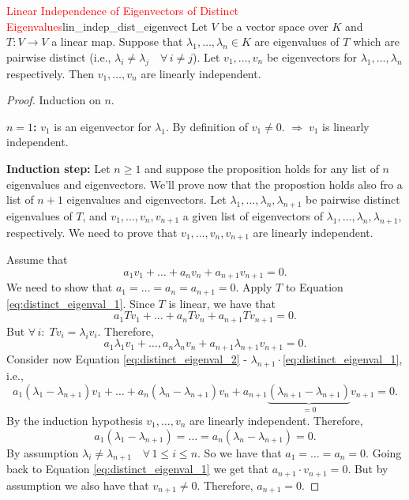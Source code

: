 \begin{proposition}{\textcolor{red}{Linear Independence of Eigenvectors of Distinct Eigenvalues}}{lin_indep_dist_eigenvect}
	Let $V$ be a vector space over $K$ and $T:V \to V$ a linear map. Suppose that $\lambda_1, \hdots , \lambda_n \in K$ are eigenvalues of $T$ which are pairwise distinct (i.e., $\lambda_i \neq \lambda_j \quad \forall \, i \neq j$). Let $v_1, \hdots , v_n$ be eigenvectors for $\lambda_1, \hdots, \lambda_n$ respectively. Then $v_1, \hdots, v_n$ are linearly independent.
\end{proposition}

\begin{proof}
	Induction on $n$.
	
	\textbf{$n = 1$:} $v_1$ is an eigenvector for $\lambda_1$. By definition of $v_1 \neq 0$. $\Longrightarrow \; v_1$ is linearly independent.
	
	\textbf{Induction step:} Let $n \geq 1$ and suppose the proposition holds for any list of $n$ eigenvalues and eigenvectors. We'll prove now that the propostion holds also fro a list of $n+1$ eigenvalues and eigenvectors. Let $\lambda_1, \hdots, \lambda_n, \lambda_{n+1}$ be pairwise distinct eigenvalues of $T$, and $v_1, \hdots , v_n, v_{n+1}$ a given list of eigenvectors of $\lambda_1, \hdots, \lambda_n, \lambda_{n+1}$, respectively. We need to prove that $v_1, \hdots , v_n, v_{n+1}$ are linearly independent.
	
	Assume that 
	\begin{equation}
		\label{eq:distinct_eigenval_1}
		a_1v_1 + \hdots + a_n v_n + a_{n+1} v_{n+1} = 0.
	\end{equation}
	We need to show that $a_1 = \hdots = a_n = a_{n+1} = 0$. Apply $T$ to Equation \eqref{eq:distinct_eigenval_1}. Since $T$ is linear, we have that
	\[
		a_1 Tv_1 + \hdots + a_n Tv_n + a_{n+1} Tv_{n+1} = 0.
	\]
	But $\forall \,i :\; Tv_i = \lambda_i v_i$. Therefore,
	\begin{equation}
		\label{eq:distinct_eigenval_2}
		a_1 \lambda_1 v_1 + \hdots, a_n \lambda_n v_n + a_{n+1}\lambda_{n+1}v_{n+1} = 0.
	\end{equation}
	Consider now Equation \eqref{eq:distinct_eigenval_2} - $\lambda_{n+1} \cdot $\eqref{eq:distinct_eigenval_1}, i.e.,
	\[
		a_1 (\lambda_1 - \lambda_{n+1}) v_1 + \hdots + a_n (\lambda_n - \lambda_{n+1}) v_n + a_{n+1}\underbrace{(\lambda_{n+1} - \lambda_{n+1})}_{\displaystyle = 0}v_{n+1} = 0.
	\]
	By the induction hypothesis $v_1, \hdots , v_n$ are linearly independent. Therefore,
	\[
		a_1 (\lambda_1 - \lambda_{n+1}) =  \hdots = a_n (\lambda_n - \lambda_{n+1}) = 0.		
	\]
	By assumption $\lambda_i \neq \lambda_{n+1} \quad \forall\, 1 \leq i \leq n$. So we have that $a_1 = \hdots = a_n = 0$. Going back to Equation \eqref{eq:distinct_eigenval_1} we get that $a_{n+1} \cdot v_{n+1} = 0$. But by assumption we also have that $v_{n+1} \neq 0$. Therefore, $a_{n+1} = 0$. \qedhere
\end{proof}


